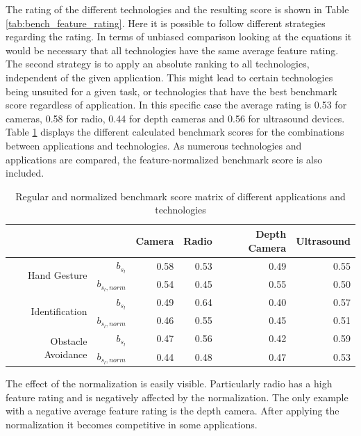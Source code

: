 The rating of the different technologies and the resulting score is shown in Table \ref{tab:bench_feature_rating}. Here it is possible to follow different strategies regarding the rating. In terms of unbiased comparison looking at the equations it would be necessary that all technologies have the same average feature rating. The second strategy is to apply an absolute ranking to all technologies, independent of the given application. This might lead to certain technologies being unsuited for a given task, or technologies that have the best benchmark score regardless of application. In this specific case the average rating is 0.53 for cameras, 0.58 for radio, 0.44 for depth cameras and 0.56 for ultrasound devices. Table \ref{tab:bench_scores} displays the different calculated benchmark scores for the combinations between applications and technologies. As numerous technologies and applications are compared, the feature-normalized benchmark score is also included.

\begin{table}[htbp]
  \centering
  \caption{Regular and normalized benchmark score matrix of different applications and technologies}
    \begin{tabular}{rrrrrr}
    \toprule
          &       & Camera & Radio & Depth Camera & Ultrasound \\
    \midrule
    \multirow{2}[0]{*}{Hand Gesture} & $b_{s_l}$ & 0.58  & 0.53  & 0.49  & 0.55 \\
          & $b_{s_l,norm}$ & 0.54  & 0.45  & 0.55  & 0.50 \\
          \midrule
    \multirow{2}[0]{*}{Identification} & $b_{s_l}$ & 0.49  & 0.64  & 0.40  & 0.57 \\
          & $b_{s_l,norm}$ & 0.46  & 0.55  & 0.45  & 0.51 \\
          \midrule
    \multirow{2}[0]{*}{Obstacle Avoidance} & $b_{s_l}$ & 0.47  & 0.56  & 0.42  & 0.59 \\
          & $b_{s_l,norm}$ & 0.44  & 0.48  & 0.47  & 0.53 \\
    \bottomrule
    \end{tabular}%
  \label{tab:bench_scores}%
\end{table}%
The effect of the normalization is easily visible. Particularly radio has a high feature rating and is negatively affected by the normalization. The only example with a negative average feature rating is the depth camera. After applying the normalization it becomes competitive in some applications.

